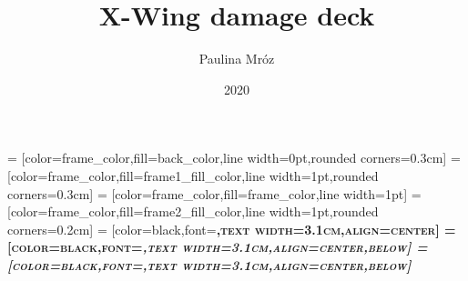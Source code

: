 \documentclass[a4paper,10pt,twoside,openright]{report}
\author{Paulina Mr\'oz}
\title{X-Wing damage deck}
\date{2020}
\begin{document}
\pagestyle{empty}


 = [color=frame_color,fill=back_color,line width=0pt,rounded corners=0.3cm]
 = [color=frame_color,fill=frame1_fill_color,line width=1pt,rounded corners=0.3cm]
 = [color=frame_color,fill=frame_color,line width=1pt]
 = [color=frame_color,fill=frame2_fill_color,line width=1pt,rounded corners=0.2cm]
 = [color=black,font=\normalsize\bfseries\scshape,text width=3.1cm,align=center]
 = [color=black,font=\footnotesize\bfseries\itshape,text width=3.1cm,align=center,below]
 = [color=black,font=\scriptsize,text width=3.1cm,align=center,below]
\end{document}
